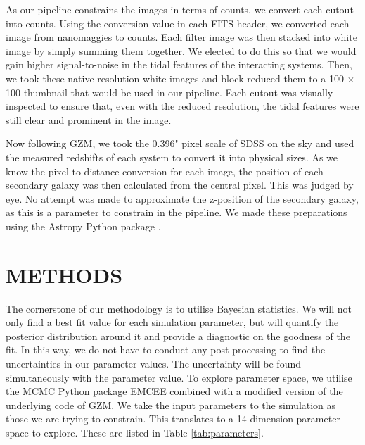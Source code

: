As our pipeline constrains the images in terms of counts, we convert each cutout into counts. Using the conversion value in each FITS header, we converted each image from nanomaggies to counts. Each filter image was then stacked into white image by simply summing them together. We elected to do this so that we would gain higher signal-to-noise in the tidal features of the interacting systems. Then, we took these native resolution white images and block reduced them to a 100 $\times$ 100 thumbnail that would be used in our pipeline. Each cutout was visually inspected to ensure that, even with the reduced resolution, the tidal features were still clear and prominent in the image.

Now following GZM, we took the 0.396" pixel scale of SDSS on the sky and used the measured redshifts of each system to convert it into physical sizes. As we know the pixel-to-distance conversion for each image, the position of each secondary galaxy was then calculated from the central pixel. This was judged by eye. No attempt was made to approximate the z-position of the secondary galaxy, as this is a parameter to constrain in the pipeline. We made these preparations using the Astropy Python package \citep{astropy_2013, astropy_2018}.

\section{METHODS}\label{Methods}
\noindent The cornerstone of our methodology is to utilise Bayesian statistics. We will not only find a best fit value for each simulation parameter, but will quantify the posterior distribution around it and provide a diagnostic on the goodness of the fit. In this way, we do not have to conduct any post-processing to find the uncertainties in our parameter values. The uncertainty will be found simultaneously with the parameter value. To explore parameter space, we utilise the MCMC Python package EMCEE combined with a modified version of the underlying code of GZM. We take the input parameters to the simulation as those we are trying to constrain. This translates to a 14 dimension parameter space to explore. These are listed in Table \ref{tab:parameters}.

